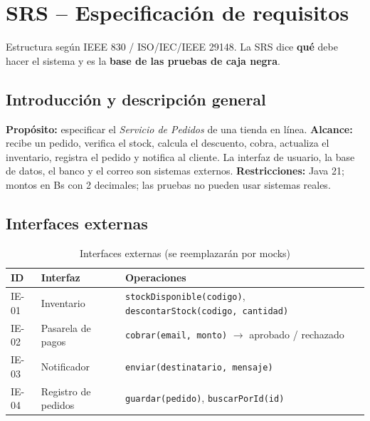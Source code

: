 \documentclass[11pt,a4paper,oneside]{report}
\newcommand{\code}[1]{\texttt{#1}}
\begin{document}
\chapter{SRS -- Especificación de requisitos}
\label{cap:srs}
Estructura según IEEE 830 / ISO/IEC/IEEE 29148. La SRS dice \textbf{qué} debe hacer el sistema y es la \textbf{base de las pruebas de caja negra}.

\section{Introducción y descripción general}
\textbf{Propósito:} especificar el \emph{Servicio de Pedidos} de una tienda en línea. \textbf{Alcance:} recibe un pedido, verifica el stock, calcula el descuento, cobra, actualiza el inventario, registra el pedido y notifica al cliente. La interfaz de usuario, la base de datos, el banco y el correo son sistemas externos. \textbf{Restricciones:} Java 21; montos en Bs con 2 decimales; las pruebas no pueden usar sistemas reales.

\section{Interfaces externas}
\begin{table}[H]
\centering
\caption{Interfaces externas (se reemplazarán por mocks)}
\small
\begin{tabularx}{\linewidth}{llX}
\toprule
\textbf{ID} & \textbf{Interfaz} & \textbf{Operaciones}\\
\midrule
IE-01 & Inventario & \code{stockDisponible(codigo)}, \code{descontarStock(codigo, cantidad)}\\
IE-02 & Pasarela de pagos & \code{cobrar(email, monto)} $\rightarrow$ aprobado / rechazado\\
IE-03 & Notificador & \code{enviar(destinatario, mensaje)}\\
IE-04 & Registro de pedidos & \code{guardar(pedido)}, \code{buscarPorId(id)}\\
\bottomrule
\end{tabularx}
\end{table}
\end{document}
